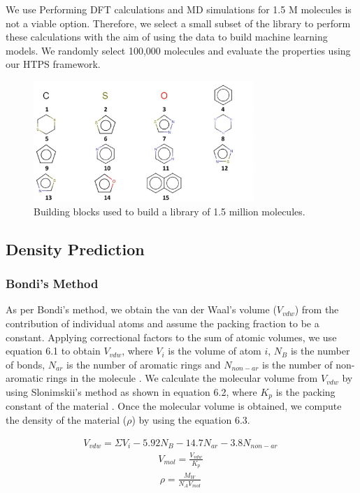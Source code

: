 We use Performing DFT calculations and MD simulations for 1.5 M molecules is not a viable option. Therefore, we select a small subset of the library to perform these calculations with the aim of using the data to build machine learning models. We randomly select 100,000 molecules and evaluate the properties using our HTPS framework. 

\begin{figure}[htbp] 
	\centering
	\includegraphics[width=0.744\textwidth]{Chapter-6/Figures/BB_list.eps}
	\caption{Building blocks used to build a library of 1.5 million molecules.}
	\label{fig:BB} 
\end{figure} 

\subsection{Density Prediction}
\label{subsec:denpred}

\subsubsection{Bondi's Method}
\label{subsec:bondis}

As per Bondi's method, we obtain the van der Waal’s volume ($V{}_{vdw}$) from the contribution of individual atoms \cite{Bondi1964} and assume the packing fraction to be a constant. Applying correctional factors to the sum of atomic volumes, we use equation 6.1 to obtain $V{}_{vdw}$, where $V_i$ is the volume of atom $i$, $N_B$ is the number of bonds, $N_{ar}$ is the number of aromatic rings and $N_{non-ar}$ is the number of non-aromatic rings in the molecule \cite{Zhao2003}. We calculate the molecular volume from $V{}_{vdw}$ by using Slonimskii's method as shown in equation 6.2, where $K_p$ is the packing constant of the material \cite{Slonimskii1970}. Once the molecular volume is obtained, we compute the density of the material ($\rho$) by using the equation 6.3.

\begin{align}
V{}_{vdw}=\Sigma V_i - 5.92N{}_B - 14.7N{}_{ar} - 3.8N{}_{non-ar}\
\end{align}
\begin{align}
V{}_{mol}=\frac{V{}_{vdw}}{K{}_p}\
\end{align}
\begin{align}
\rho=\frac{M{}_W}{N{}_A V{}_{mol}}\
\end{align}

